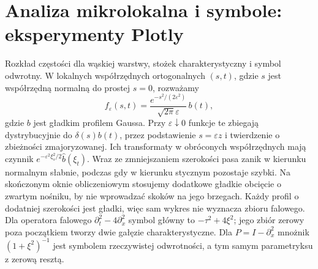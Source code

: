 \section{Analiza mikrolokalna i symbole: eksperymenty Plotly}
\label{sec:pde31-code}
Rozkład częstości dla wąskiej warstwy, stożek
charakterystyczny i symbol odwrotny.
W lokalnych współrzędnych ortogonalnych $(s,t)$,
gdzie $s$ jest współrzędną normalną do prostej $s=0$,
rozważamy
\[
 f_\varepsilon(s,t)=
 \frac{e^{-s^2/(2\varepsilon^2)}}{\sqrt{2\pi}\varepsilon}\,b(t),
\]
gdzie $b$ jest gładkim profilem Gaussa.
Przy $\varepsilon\downarrow0$ funkcje te zbiegają
dystrybucyjnie do $\delta(s)b(t)$, przez podstawienie
$s=\varepsilon z$ i twierdzenie o zbieżności zmajoryzowanej.
Ich transformaty w obróconych współrzędnych mają czynnik
$e^{-\varepsilon^2\xi_s^2/2}\widehat b(\xi_t)$.
Wraz ze zmniejszaniem szerokości pasa zanik
w kierunku normalnym słabnie, podczas gdy w kierunku
stycznym pozostaje szybki. Na skończonym oknie
obliczeniowym stosujemy dodatkowe gładkie obcięcie
o zwartym nośniku, by nie wprowadzać skoków na jego brzegach.
Każdy profil o dodatniej szerokości jest gładki,
więc sam wykres nie wyznacza zbioru falowego.
Dla operatora falowego $\partial_t^2-4\partial_x^2$
symbol główny to $-\tau^2+4\xi^2$; jego zbiór zerowy
poza początkiem tworzy dwie gałęzie charakterystyczne.
Dla $P=I-\partial_x^2$ mnożnik $(1+\xi^2)^{-1}$
jest symbolem rzeczywistej odwrotności, a tym samym
parametryksu z zerową resztą.
